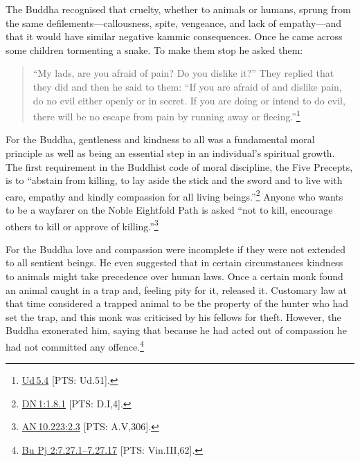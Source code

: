 \documentclass[10pt, openright]{book}
\begin{document}
The Buddha recognised that cruelty, whether to animals or humans, sprung from the same defilements—callousness, spite, vengeance, and lack of empathy—and that it would have similar negative kammic consequences. Once he came across some children tormenting a snake. To make them stop he asked them:


\begin{quote}

\hspace{-0.4em}“My lads, are you afraid of pain? Do you dislike it?” They replied that they did and then he said to them: “If you are afraid of and dislike pain, do no evil either openly or in secret. If you are doing or intend to do evil, there will be no escape from pain by running away or fleeing.”\footnote {\href{https://suttacentral.net/ud5.4/en/sujato}{Ud 5.4} [PTS: Ud.51].}


\end{quote}
For the Buddha, gentleness and kindness to all was a fundamental moral principle as well as being an essential step in an individual’s spiritual growth. The first requirement in the Buddhist code of moral discipline, the Five Precepts, is to “abstain from killing, to lay aside the stick and the sword and to live with care, empathy and kindly compassion for all living beings.”\footnote {\href{https://suttacentral.net/dn1/en/sujato\#1.8.1}{DN 1:1.8.1} [PTS: D.I,4].} Anyone who wants to be a wayfarer on the Noble Eightfold Path is asked “not to kill, encourage others to kill or approve of killing.”\footnote {\href{https://suttacentral.net/an10.223/en/sujato\#2.3}{AN 10.223:2.3} [PTS: A.V,306].}


For the Buddha love and compassion were incomplete if they were not extended to all sentient beings. He even suggested that in certain circumstances kindness to animals might take precedence over human laws. Once a certain monk found an animal caught in a trap and, feeling pity for it, released it. Customary law at that time considered a trapped animal to be the property of the hunter who had set the trap, and this monk was criticised by his fellows for theft. However, the Buddha exonerated him, saying that because he had acted out of compassion he had not committed any offence.\footnote {\href{https://suttacentral.net/pli-tv-bu-vb-pj2/en/brahmali#7.27.1}{Bu Pj 2:7.27.1–7.27.17} [PTS: Vin.III,62].}
\end{document}
